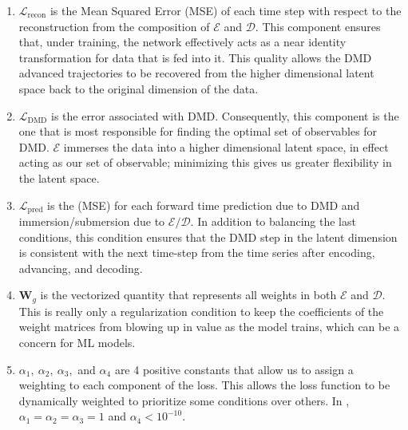 \begin{enumerate}
    \item $\mathcal{L}_{\text{recon}}$ is the Mean Squared Error (MSE) of each time step
    with respect to the reconstruction from the composition of $\mathcal{E}$ and $\mathcal{D}$. 
    This component ensures that, under training, the network effectively acts as a near identity 
    transformation for data that is fed into it. This quality allows the DMD advanced trajectories 
    to be recovered from the higher dimensional latent space back to the original dimension of 
    the data.
    
    \item $\mathcal{L}_{\text{DMD}}$ is the error associated with DMD. Consequently, this 
    component is the one that is most responsible for finding the optimal set of observables for DMD.
    $\mathcal{E}$ immerses the data into a higher dimensional latent space, in effect acting as our 
    set of observable; minimizing this gives us greater flexibility in the latent space.
    
    \item $\mathcal{L}_{\text{pred}}$ is the (MSE) for each forward time prediction due to DMD and 
    immersion/submersion due to $\mathcal{E}/\mathcal{D}$. In addition to balancing the last conditions, 
    this condition ensures that the DMD step in the latent dimension is consistent with the next time-step from 
    the time series after encoding, advancing, and decoding.  
    
    \item $\boldsymbol{W}_g$ is the vectorized quantity that represents all weights in both $\mathcal{E}$
    and $\mathcal{D}$. This is really only a regularization condition to keep the coefficients of the 
    weight matrices from blowing up in value as the model trains, which can be a 
    concern for ML models.
    
    \item $\alpha_1,\ \alpha_2,\ \alpha_3,$ and $\alpha_4$ are 4 positive constants that allow us to assign a 
    weighting to each component of the loss. This allows the loss function to be dynamically weighted to 
    prioritize some conditions over others. In \cite{lago}, $\alpha_1 = \alpha_2 = \alpha_3 = 1$ and 
    $\alpha_4 < 10^{-10}$.
\end{enumerate}

